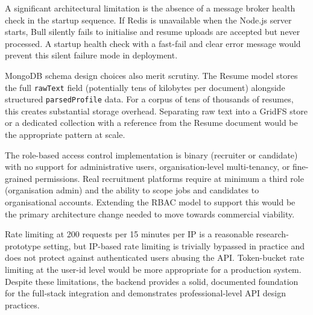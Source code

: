 A significant architectural limitation is the absence of a message broker health check in the startup sequence. If Redis is unavailable when the Node.js server starts, Bull silently fails to initialise and resume uploads are accepted but never processed. A startup health check with a fast-fail and clear error message would prevent this silent failure mode in deployment.

MongoDB schema design choices also merit scrutiny. The Resume model stores the full \texttt{rawText} field (potentially tens of kilobytes per document) alongside structured \texttt{parsedProfile} data. For a corpus of tens of thousands of resumes, this creates substantial storage overhead. Separating raw text into a GridFS store or a dedicated collection with a reference from the Resume document would be the appropriate pattern at scale.

The role-based access control implementation is binary (recruiter or candidate) with no support for administrative users, organisation-level multi-tenancy, or fine-grained permissions. Real recruitment platforms require at minimum a third role (organisation admin) and the ability to scope jobs and candidates to organisational accounts. Extending the RBAC model to support this would be the primary architecture change needed to move towards commercial viability.

Rate limiting at 200 requests per 15 minutes per IP is a reasonable research-prototype setting, but IP-based rate limiting is trivially bypassed in practice and does not protect against authenticated users abusing the API. Token-bucket rate limiting at the user-id level would be more appropriate for a production system. Despite these limitations, the backend provides a solid, documented foundation for the full-stack integration and demonstrates professional-level API design practices.
